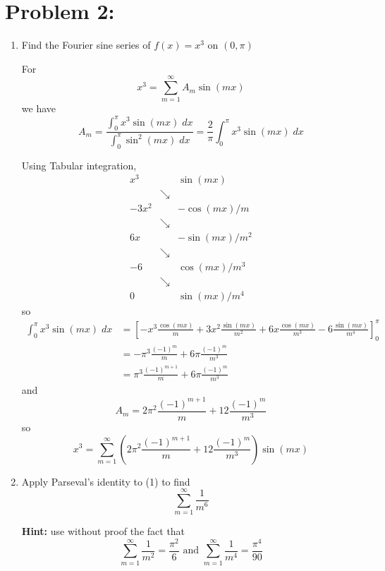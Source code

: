 \documentclass[12pt]{article}
\begin{document}
\section*{Problem 2:}
\begin{enumerate}
    \item Find the Fourier sine series of $f(x) = x^3$ on $(0, \pi)$
    
    \color{blue}
    For 
    \[x^3 = \sum_{m=1}^\infty A_m \sin(mx)\]
    we have 
    \[A_m = \frac{\int_0^\pi x^3\sin(mx)\; dx}{\int_0^\pi \sin^2(mx)\; dx} = \frac{2}{\pi} \int_0^\pi x^3\sin(mx)\;dx\]

    Using Tabular integration,
    \[\begin{array}{ccc}
        x^3 & & \sin(mx)\\
        & \searrow & \\
        -3x^2 & & -\cos(mx)/m\\
        & \searrow & \\
        6x & & -\sin(mx)/m^2\\
        & \searrow & \\
        -6 & & \cos(mx)/m^3\\
        & \searrow & \\
        0 & & \sin(mx)/m^4
    \end{array}\]
    so 
    \begin{align*}
       \int_0^\pi x^3\sin(mx)\;dx &= \left[-x^3 \frac{\cos(mx)}{m} + 3x^2 \frac{\sin(mx)}{m^2} + 6x\frac{\cos(mx)}{m^3} - 6\frac{\sin(mx)}{m^4}\right]_0^\pi\\
       &= -\pi^3 \frac{(-1)^m}{m} + 6\pi\frac{(-1)^m}{m^3}\\
       &= \pi^3 \frac{(-1)^{m+1}}{m} + 6\pi \frac{(-1)^m}{m^3}
    \end{align*}
    and 
    \[A_m = 2\pi^2 \frac{(-1)^{m+1}}{m} + 12\frac{(-1)^m}{m^3}\]
    so 
    \[\boxed{x^3 = \sum_{m=1}^\infty (2\pi^2 \frac{(-1)^{m+1}}{m} + 12\frac{(-1)^m}{m^3})\sin(mx)}\]

    \color{black}
    \item Apply Parseval's identity to (1) to find
    \[\sum_{m=1}^\infty \frac{1}{m^6}\]

    \textbf{Hint:} use without proof the fact that 
    \[\sum_{m=1}^\infty \frac{1}{m^2} = \frac{\pi^2}{6} \text{ and } \sum_{m=1}^\infty \frac{1}{m^4} = \frac{\pi^4}{90}\]


\end{enumerate}
\end{document}
